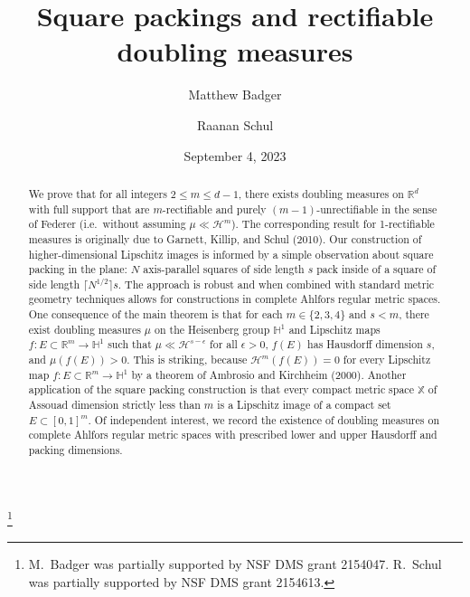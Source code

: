 \documentclass[12pt]{amsart}
\theoremstyle{definition}
\theoremstyle{remark}
\newcommand{\XX}{\mathbb{X}}
\newcommand{\Haus}{\mathcal{H}}
\numberwithin{figure}{section}
\numberwithin{equation}{section}
\begin{document}
\title{Square packings and rectifiable doubling measures}
\thanks{M.~Badger was partially supported by NSF DMS grant 2154047.
R.~Schul was partially supported by NSF  DMS grant 2154613.}
\date{September 4, 2023}
\author{Matthew Badger \and Raanan Schul}
\address{Department of Mathematics\\ University of Connecticut\\ Storrs, CT 06269-1009}
\address{Department of Mathematics\\ Stony Brook University\\ Stony Brook, NY 11794-3651}

\begin{abstract}  We prove that for all integers $2\leq m\leq d-1$, there exists doubling measures on $\mathbb{R}^d$ with full support that are $m$-rectifiable and purely $(m-1)$-unrectifiable in the sense of Federer (i.e.~without assuming $\mu\ll\mathcal{H}^m$). The corresponding result for 1-rectifiable measures is originally due to Garnett, Killip, and Schul (2010). Our construction of higher-dimensional Lipschitz images is informed by a simple observation about square packing in the plane: $N$ axis-parallel squares of side length $s$ pack inside of a square of side length $\lceil N^{1/2}\rceil s$. The approach is robust and when combined with standard metric geometry techniques allows for constructions in complete Ahlfors regular metric spaces. One consequence of the main theorem is that for each $m\in\{2,3,4\}$ and $s<m$, there exist doubling measures $\mu$ on the Heisenberg group $\mathbb{H}^1$ and Lipschitz maps $f:E\subset\mathbb{R}^m\rightarrow\mathbb{H}^1$ such that $\mu\ll\mathcal{H}^{s-\epsilon}$ for all $\epsilon>0$, $f(E)$ has Hausdorff dimension $s$, and $\mu(f(E))>0$. This is striking, because $\Haus^m(f(E))=0$ for every Lipschitz map $f:E\subset\mathbb{R}^m\rightarrow\mathbb{H}^1$ by a theorem of Ambrosio and Kirchheim (2000). Another application of the square packing construction is that every compact metric space $\XX$ of Assouad dimension strictly less than $m$ is a Lipschitz image of a compact set $E\subset[0,1]^m$. Of independent interest, we record the existence of doubling measures on complete Ahlfors regular metric spaces with prescribed lower and upper Hausdorff and packing dimensions.
\end{abstract}
\end{document}

